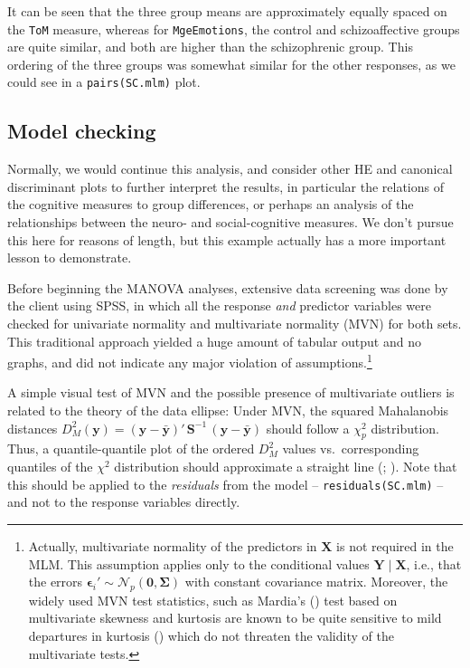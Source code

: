 \documentclass[
  letterpaper,
  10pt,
  krantz2]{krantz}
\begin{document}
It can be seen that the three group means are approximately equally
spaced on the \texttt{ToM} measure, whereas for \texttt{MgeEmotions},
the control and schizoaffective groups are quite similar, and both are
higher than the schizophrenic group. This ordering of the three groups
was somewhat similar for the other responses, as we could see in a
\texttt{pairs(SC.mlm)} plot.

\subsection{Model checking}\label{model-checking}

Normally, we would continue this analysis, and consider other HE and
canonical discriminant plots to further interpret the results, in
particular the relations of the cognitive measures to group differences,
or perhaps an analysis of the relationships between the neuro- and
social-cognitive measures. We don't pursue this here for reasons of
length, but this example actually has a more important lesson to
demonstrate.

Before beginning the MANOVA analyses, extensive data screening was done
by the client using SPSS, in which all the response \emph{and} predictor
variables were checked for univariate normality and multivariate
normality (MVN) for both sets. This traditional approach yielded a huge
amount of tabular output and no graphs, and did not indicate any major
violation of assumptions.\footnote{Actually, multivariate normality of
  the predictors in \(\mathbf{X}\) is not required in the MLM. This
  assumption applies only to the conditional values
  \(\mathbf{Y} \;|\; \mathbf{X}\), i.e., that the errors
  \(\mathbf{\epsilon}_{i}' \sim \mathcal{N}_{p}(\mathbf{0},\boldsymbol{\Sigma})\)
  with constant covariance matrix. Moreover, the widely used MVN test
  statistics, such as Mardia's ()
  test based on multivariate skewness and kurtosis are known to be quite
  sensitive to mild departures in kurtosis
  () which do not threaten the
  validity of the multivariate tests.}

A simple visual test of MVN and the possible presence of multivariate
outliers is related to the theory of the data ellipse: Under MVN, the
squared Mahalanobis distances
\(D^2_M (\mathbf{y}) = (\mathbf{y} - \bar{\mathbf{y}})' \, \mathbf{S}^{-1} \, (\mathbf{y} - \bar{\mathbf{y}})\)
should follow a \(\chi^2_p\) distribution. Thus, a quantile-quantile
plot of the ordered \(D^2_M\) values vs.~corresponding quantiles of the
\(\chi^2\) distribution should approximate a straight line
(;
). Note that this should be
applied to the \emph{residuals} from the model --
\texttt{residuals(SC.mlm)} -- and not to the response variables
directly.
\end{document}
